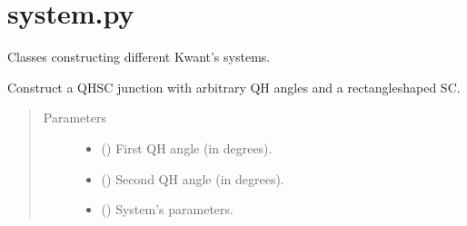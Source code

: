 \documentclass[letterpaper,10pt,english]{sphinxmanual}
\begin{document}
\section{system.py}
\label{\detokenize{modules:module-modules.system}}\label{\detokenize{modules:system-py}}
\sphinxAtStartPar
Classes constructing different Kwant’s systems.

\begin{fulllineitems}
\label{\detokenize{modules:modules.system.Device}}
\pysigstartsignatures
{}
\pysigstopsignatures
\sphinxAtStartPar
Construct a QH\sphinxhyphen{}SC junction with arbitrary QH angles and a rectangle\sphinxhyphen{}shaped SC.
\begin{quote}\begin{description}
\item[{Parameters}] \leavevmode\begin{itemize}
\item {} 
\sphinxAtStartPar
{} () \textendash{} First QH angle (in degrees).

\item {} 
\sphinxAtStartPar
{} () \textendash{} Second QH angle (in degrees).

\item {} 
\sphinxAtStartPar
{} () \textendash{} System’s parameters.

\end{itemize}

\end{description}\end{quote}


\end{fulllineitems}
\end{document}

